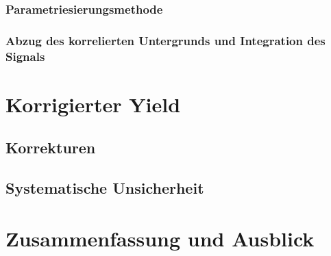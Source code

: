 \documentclass[11pt]{article}
\begin{document}
\subsubsection{Parametriesierungsmethode} \label{s3s4s3}

\subsubsection{Abzug des korrelierten Untergrunds und Integration des Signals} \label{s3s4s4}
\newpage
\section{Korrigierter Yield} \label{s4}

\subsection{Korrekturen} \label{s4s1}

\subsection{Systematische Unsicherheit} \label{s4s2}

\section{Zusammenfassung und Ausblick} \label{s5}

\newpage
 

\end{document}
